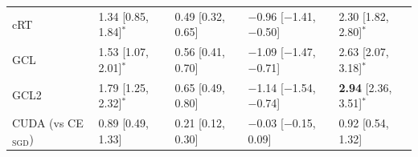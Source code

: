 \begin{table}[t]
\begin{tabular}{@{}lllll@{}}
\addlinespace[2pt]
cRT & 1.34 [0.85, 1.84]$^{*}$ & 0.49 [0.32, 0.65] & $-$0.96 [$-$1.41, $-$0.50] & 2.30 [1.82, 2.80]$^{*}$ \\
GCL & 1.53 [1.07, 2.01]$^{*}$ & 0.56 [0.41, 0.70] & $-$1.09 [$-$1.47, $-$0.71] & 2.63 [2.07, 3.18]$^{*}$ \\
GCL2 & 1.79 [1.25, 2.32]$^{*}$ & 0.65 [0.49, 0.80] & $-$1.14 [$-$1.54, $-$0.74] & \textbf{2.94} [2.36, 3.51]$^{*}$ \\
\addlinespace[2pt]
CUDA (vs CE$_\mathrm{SGD}$) & 0.89 [0.49, 1.33] & 0.21 [0.12, 0.30] & $-$0.03 [$-$0.15, 0.09] & 0.92 [0.54, 1.32] \\
\bottomrule\end{tabular}\end{table}
